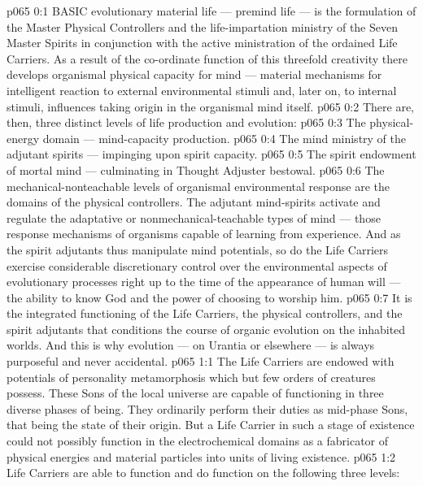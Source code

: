 \vs p065 0:1 BASIC evolutionary material life --- premind life --- is the formulation of the Master Physical Controllers and the life\hyp{}impartation ministry of the Seven Master Spirits in conjunction with the active ministration of the ordained Life Carriers. As a result of the co\hyp{}ordinate function of this threefold creativity there develops organismal physical capacity for mind --- material mechanisms for intelligent reaction to external environmental stimuli and, later on, to internal stimuli, influences taking origin in the organismal mind itself.
\vs p065 0:2 \pc There are, then, three distinct levels of life production and evolution:
\vs p065 0:3 \bibnobreakspace The physical\hyp{}energy domain --- mind\hyp{}capacity production.
\vs p065 0:4 \bibnobreakspace The mind ministry of the adjutant spirits --- impinging upon spirit capacity.
\vs p065 0:5 \bibnobreakspace The spirit endowment of mortal mind --- culminating in Thought Adjuster bestowal.
\vs p065 0:6 \pc The mechanical\hyp{}nonteachable levels of organismal environmental response are the domains of the physical controllers. The adjutant mind\hyp{}spirits activate and regulate the adaptative or nonmechanical\hyp{}teachable types of mind --- those response mechanisms of organisms capable of learning from experience. And as the spirit adjutants thus manipulate mind potentials, so do the Life Carriers exercise considerable discretionary control over the environmental aspects of evolutionary processes right up to the time of the appearance of human will --- the ability to know God and the power of choosing to worship him.
\vs p065 0:7 It is the integrated functioning of the Life Carriers, the physical controllers, and the spirit adjutants that conditions the course of organic evolution on the inhabited worlds. And this is why evolution --- on Urantia or elsewhere --- is always purposeful and never accidental.
\vs p065 1:1 The Life Carriers are endowed with potentials of personality metamorphosis which but few orders of creatures possess. These Sons of the local universe are capable of functioning in three diverse phases of being. They ordinarily perform their duties as mid\hyp{}phase Sons, that being the state of their origin. But a Life Carrier in such a stage of existence could not possibly function in the electrochemical domains as a fabricator of physical energies and material particles into units of living existence.
\vs p065 1:2 Life Carriers are able to function and do function on the following three levels:
